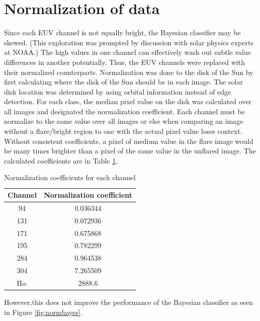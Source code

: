 \documentclass[twoside]{report}
\newcommand{\halpha}{H$\alpha$\,}
\begin{document}
\section{Normalization of data}
Since each EUV channel is not equally bright, the Bayesian classifier may be skewed. (This exploration was prompted by discussion with solar physics experts at NOAA.) The high values in one channel can effectively wash out subtle value differences in another potentially. Thus, the EUV channels were replaced with their normalized counterparts. Normalization was done to the disk of the Sun by first calculating where the disk of the Sun should be in each image. The solar disk location was determined by using orbital information instead of edge detection. For each class, the median pixel value on the disk was calculated over all images and designated the normalization coefficient. Each channel must be normalize to the same value over all images or else when comparing an image without a flare/bright region to one with the actual pixel value loses context. Without consistent coefficients, a pixel of medium value in the flare image would be many times brighter than a pixel of the same value in the unflared image. The calculated coefficients are in Table \ref{tab:normcoefficients}. 

\begin{table}[ht!]
\centering
 \begin{tabular}{|c c |} 
 \hline
 Channel & Normalization coefficient\\
   \hline
   94 &  0.036344 \\
   131 & 0.072936 \\
   171 & 0.675868 \\
   195 & 0.782299 \\
   284 & 0.964538 \\
   304 & 7.265509 \\
   \halpha & 2888.6 \\
 \hline
 \end{tabular}
 \caption{Normalization coefficients for each channel}
 \label{tab:normcoefficients}
\end{table}

However,this does not improve the performance of the Bayesian classifier as seen in Figure \ref{fig:normbayes}. 
\end{document}
